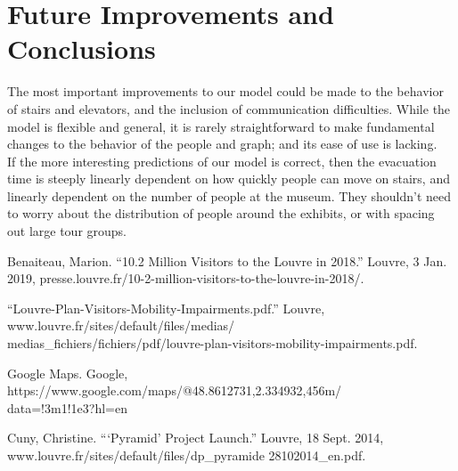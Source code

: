 \documentclass[12pt]{article}
\begin{document}
\section{Future Improvements and Conclusions}
The most important improvements to our model could be made to the behavior of stairs and elevators, and the inclusion of communication difficulties. While the model is flexible and general, it is rarely straightforward to make fundamental changes to the behavior of the people and graph; and its ease of use is lacking.\\

If the more interesting predictions of our model is correct, then the evacuation time is steeply linearly dependent on how quickly people can move on stairs, and linearly dependent on the number of people at the museum. They shouldn't need to worry about the distribution of people around the exhibits, or with spacing out large tour groups.

\newpage
\begin{thebibliography}{1}

\bibitem{} Benaiteau, Marion. “10.2 Million Visitors to the Louvre in 2018.” Louvre, 3 Jan. 2019, presse.louvre.fr/10-2-million-visitors-to-the-louvre-in-2018/. 

\bibitem{} “Louvre-Plan-Visitors-Mobility-Impairments.pdf.” Louvre, www.louvre.fr/sites/default/files/medias/\\medias\_fichiers/fichiers/pdf/louvre-plan-visitors-mobility-impairments.pdf.

\bibitem{} Google Maps. Google, https://www.google.com/maps/@48.8612731,2.334932,456m/\\data=!3m1!1e3?hl=en

\bibitem{} Cuny, Christine. “‘Pyramid’ Project Launch.” Louvre, 18 Sept. 2014, www.louvre.fr/sites/default/files/dp\_pyramide 28102014\_en.pdf. 

\end{thebibliography}
\end{document}
